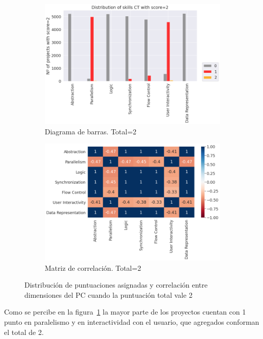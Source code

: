 \documentclass[a4paper, 12pt]{book}
\begin{document}
\begin{figure}[H]
    \centering
    \begin{subfigure}[h]{.49\textwidth} 
        \includegraphics[width=\textwidth]{img/distribucion_2_Scratch}
        \caption{Diagrama de barras. Total=2}
        \label{fig:total2}
    \end{subfigure}       
    \begin{subfigure}[h]{.49\textwidth} 
        \includegraphics[width=\textwidth]{img/corr_2_Scratch}
        \caption{Matriz de correlación. Total=2}
        \label{fig:corr2}
    \end{subfigure}
     \caption{Distribución de puntuaciones asignadas y correlación entre dimensiones del PC cuando la puntuación total vale 2}
\end{figure}

Como se percibe en la figura~\ref{fig:total2} la mayor parte de los proyectos cuentan con 1 punto en paralelismo y en interactividad con el usuario, que agregados conforman el total de 2.
\end{document}
